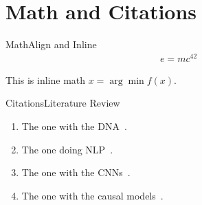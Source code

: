 \section{Math and Citations}

\begin{frame}{Math}{Align and Inline }
  \begin{align}
    e = mc^{42}
  \end{align}

  This is inline math $x = \arg\min f(x)$.
\end{frame}

\begin{frame}{Citations}{Literature Review }
  \begin{enumerate}
    \item The one with the DNA~\parencite{geraci2019technology}.
    \item The one doing NLP~\parencite{massidda2020rmassidda}.
    \item The one with the CNNs~\parencite{massidda2023knowledge}.
    \item The one with the causal models~\parencite{massidda2023causal}.
  \end{enumerate}
\end{frame}
